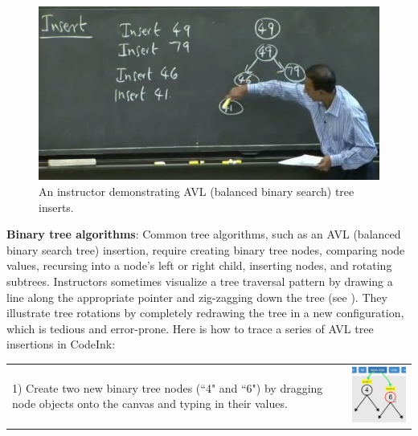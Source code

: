 \begin{figure}

\begin{center}
\includegraphics[width=0.7\columnwidth]{img/6006/bst.png}
\end{center}

\vspace{-0.75em}

\caption{An instructor demonstrating AVL (balanced binary search) tree
inserts.}
\vspace{-0.75em}

\label{fig:example-bst}
\end{figure}


\noindent \textbf{Binary tree algorithms}:
Common tree algorithms, such as an AVL (balanced binary search tree) insertion,
require creating binary tree nodes, comparing node values, recursing into a
node's left or right child, inserting nodes, and rotating subtrees. Instructors
sometimes visualize a tree traversal pattern by drawing a line along the
appropriate pointer and zig-zagging down the tree (see ). They illustrate tree rotations by completely redrawing
the tree in a new configuration, which is tedious and error-prone. Here is how
to trace a series of AVL tree insertions in CodeInk:

\noindent \begin{tabular}{m{4.6cm} m{3.4cm}}

1) Create two new binary tree nodes (``4" and ``6") by dragging node
objects onto the canvas and typing in their values.

& \includegraphics[width=3.4cm]{img/examples/bst-1.png}
\end{tabular}


